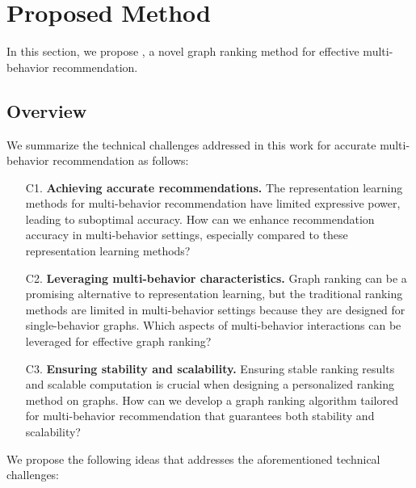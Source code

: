 \section{Proposed Method}
\label{sec:proposed}
In this section, we propose \method, a novel graph ranking method for effective multi-behavior recommendation.

\subsection{Overview}
\label{sec:proposed:overview}
We summarize the technical challenges addressed in this work for accurate multi-behavior recommendation as follows:

\begin{enumerate}[leftmargin=8mm,noitemsep]
    \item[C1.]{
        \textbf{Achieving accurate recommendations.}
        The representation learning methods for multi-behavior recommendation have limited expressive power, leading to suboptimal accuracy. 
        How can we enhance recommendation accuracy in multi-behavior settings, especially compared to these representation learning methods?
    }
    \item[C2.]{
        \textbf{Leveraging multi-behavior characteristics.}
        Graph ranking can be a promising alternative to representation learning, but the traditional ranking methods are limited in multi-behavior settings because they are designed for single-behavior graphs.
        Which aspects of multi-behavior interactions can be leveraged for effective graph ranking?
    }
    \item[C3.]{
        \textbf{Ensuring stability and scalability.}
        Ensuring stable ranking results and scalable computation is crucial when designing a personalized ranking method on graphs.
        How can we develop a graph ranking algorithm tailored for multi-behavior recommendation that guarantees both stability and scalability?
    }
\end{enumerate}

We propose the following ideas that addresses the aforementioned technical challenges:

